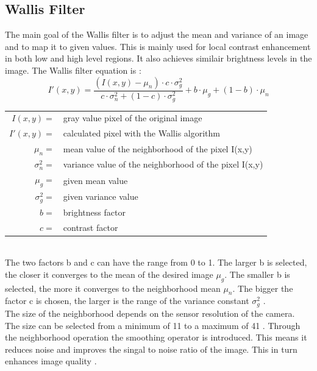\subsection{Wallis Filter}\label{ch:th_wallis_filter}
The main goal of the Wallis filter is to adjust the mean and variance of an
image and to map it to given values. This is mainly used for local contrast
enhancement in both low and high level regions. It also achieves similair brightness levels in the image.
The Wallis filter equation is \cite{wallis_filter}:
\begin{equation}
    I'(x,y) = \frac{( I(x,y) - \mu_{n})\cdot c \cdot \sigma_{g}^{2}}{c \cdot \sigma_{n}^{2} + (1 - c) \cdot \sigma_{g}^{2}} + b \cdot \mu_{g} + (1 - b) \cdot \mu_{n}
    \label{eq:wallis_filter}
\end{equation} 

\begin{tabular}{rl}
    $I(x,y)         =$ & gray value pixel of the original image \\
    $I'(x,y)        =$ & calculated pixel with the Wallis algorithm \\
    $\mu_{n}        =$ & mean value of the neighborhood of the pixel I(x,y) \\
    $\sigma_{n}^{2} =$ & variance value of the neighborhood of the pixel I(x,y) \\
    $\mu_{g}        =$ & given mean value\\
    $\sigma_{g}^{2} =$ & given variance value\\
    $b              =$ & brightness factor \\
    $c              =$ & contrast factor \\
\end{tabular} \\

The two factors b and c can have the range from 0 to 1. The larger b is
selected, the closer it converges to the mean of the desired image $\mu_{g}$. The smaller b is selected, the more it converges to the neighborhood mean $\mu_{n}$.
The bigger the factor c is chosen, the larger is the range of the variance constant $\sigma_{g}^{2}$ \cite{wallis_filter}. \\
The size of the neighborhood depends on the sensor resolution of the camera. The size can be selected from a minimum of 11 to a maximum of 41 \cite{zeng_2018}. Through the neighborhood operation the smoothing operator is introduced. This means it reduces noise and improves the singal to noise ratio of the image. This in turn enhances image quality \cite{wallis_filter}.

